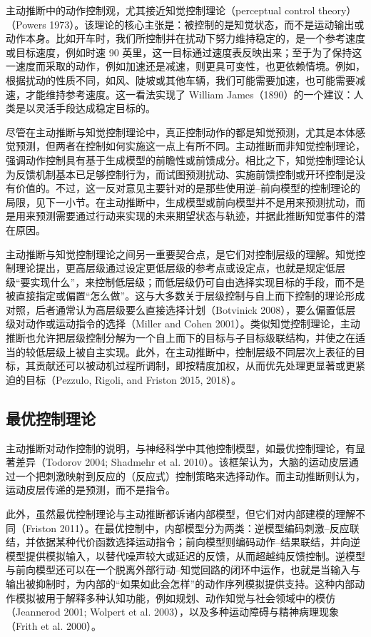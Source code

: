 主动推断中的动作控制观，尤其接近知觉控制理论（perceptual control theory）（Powers 1973）。该理论的核心主张是：被控制的是知觉状态，而不是运动输出或动作本身。比如开车时，我们所控制并在扰动下努力维持稳定的，是一个参考速度或目标速度，例如时速 90 英里，这一目标通过速度表反映出来；至于为了保持这一速度而采取的动作，例如加速还是减速，则更具可变性，也更依赖情境。例如，根据扰动的性质不同，如风、陡坡或其他车辆，我们可能需要加速，也可能需要减速，才能维持参考速度。这一看法实现了 William James（1890）的一个建议：人类是以灵活手段达成稳定目标的。

尽管在主动推断与知觉控制理论中，真正控制动作的都是知觉预测，尤其是本体感觉预测，但两者在控制如何实施这一点上有所不同。主动推断而非知觉控制理论，强调动作控制具有基于生成模型的前瞻性或前馈成分。相比之下，知觉控制理论认为反馈机制基本已足够控制行为，而试图预测扰动、实施前馈控制或开环控制是没有价值的。不过，这一反对意见主要针对的是那些使用逆--前向模型的控制理论的局限，见下一小节。在主动推断中，生成模型或前向模型并不是用来预测扰动，而是用来预测需要通过行动来实现的未来期望状态与轨迹，并据此推断知觉事件的潜在原因。

主动推断与知觉控制理论之间另一重要契合点，是它们对控制层级的理解。知觉控制理论提出，更高层级通过设定更低层级的参考点或设定点，也就是规定低层级“要实现什么”，来控制低层级；而低层级仍可自由选择实现目标的手段，而不是被直接指定或偏置“怎么做”。这与大多数关于层级控制与自上而下控制的理论形成对照，后者通常认为高层级要么直接选择计划（Botvinick 2008），要么偏置低层级对动作或运动指令的选择（Miller and Cohen 2001）。类似知觉控制理论，主动推断也允许把层级控制分解为一个自上而下的目标与子目标级联结构，并使之在适当的较低层级上被自主实现。此外，在主动推断中，控制层级不同层次上表征的目标，其贡献还可以被动机过程所调制，即按精度加权，从而优先处理更显著或更紧迫的目标（Pezzulo, Rigoli, and Friston 2015, 2018）。

\subsection{最优控制理论}

主动推断对动作控制的说明，与神经科学中其他控制模型，如最优控制理论，有显著差异（Todorov 2004; Shadmehr et al. 2010）。该框架认为，大脑的运动皮层通过一个把刺激映射到反应的（反应式）控制策略来选择动作。而主动推断则认为，运动皮层传递的是预测，而不是指令。

此外，虽然最优控制理论与主动推断都诉诸内部模型，但它们对内部建模的理解不同（Friston 2011）。在最优控制中，内部模型分为两类：逆模型编码刺激--反应联结，并依据某种代价函数选择运动指令；前向模型则编码动作--结果联结，并向逆模型提供模拟输入，以替代噪声较大或延迟的反馈，从而超越纯反馈控制。逆模型与前向模型还可以在一个脱离外部行动--知觉回路的闭环中运作，也就是当输入与输出被抑制时，为内部的“如果如此会怎样”的动作序列模拟提供支持。这种内部动作模拟被用于解释多种认知功能，例如规划、动作知觉与社会领域中的模仿（Jeannerod 2001; Wolpert et al. 2003），以及多种运动障碍与精神病理现象（Frith et al. 2000）。

